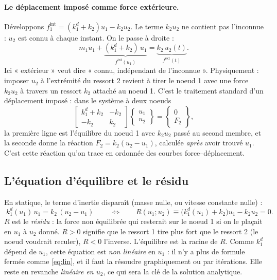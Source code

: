\documentclass[11pt,a4paper]{article}
\newcommand{\kd}{k_1^{d}}
\begin{document}
\paragraph{Le déplacement imposé comme force extérieure.} Développons
$f^{\text{int}}_1 = (\kd+k_2)u_1 - k_2u_2$. Le terme $k_2u_2$ ne contient pas l'inconnue : $u_2$
est connu à chaque instant. On le passe à droite :
\begin{equation}
  m_1\ddot u_1 + \underbrace{(\kd+k_2)\,u_1}_{f^{\text{int}}(u_1)} = \underbrace{k_2\,u_2(t)}_{f^{\text{ext}}(t)} .
\end{equation}
Ici « extérieur » veut dire « connu, indépendant de l'inconnue ». Physiquement : imposer $u_2$
à l'extrémité du ressort 2 revient à tirer le noeud 1 avec une force $k_2u_2$ à travers un
ressort $k_2$ attaché au noeud 1. C'est le traitement standard d'un déplacement imposé : dans
le système à deux noeuds
\begin{equation}
  \begin{bmatrix} \kd+k_2 & -k_2\\ -k_2 & k_2\end{bmatrix}
  \begin{Bmatrix}u_1\\u_2\end{Bmatrix} = \begin{Bmatrix}0\\F_2\end{Bmatrix},
\end{equation}
la première ligne est l'équilibre du noeud 1 avec $k_2u_2$ passé au second membre, et la seconde
donne la réaction $F_2 = k_2(u_2-u_1)$, calculée \emph{après} avoir trouvé $u_1$. C'est cette
réaction qu'on trace en ordonnée des courbes force--déplacement.

\subsection{L'équation d'équilibre et le résidu}
En statique, le terme d'inertie disparaît (masse nulle, ou vitesse constante nulle) :
\begin{equation}
  \boxed{\;\kd(u_1)\,u_1 = k_2\,(u_2-u_1)\;}
  \qquad\Longleftrightarrow\qquad
  R(u_1;u_2) \equiv \bigl(\kd(u_1)+k_2\bigr)u_1 - k_2u_2 = 0 .
  \label{eq:eq}
\end{equation}
$R$ est le \emph{résidu} : la force non équilibrée qui resterait sur le noeud 1 si on le
plaçait en $u_1$ à $u_2$ donné. $R > 0$ signifie que le ressort 1 tire plus fort que le
ressort 2 (le noeud voudrait reculer), $R < 0$ l'inverse. L'équilibre est la racine de $R$.
Comme $\kd$ dépend de $u_1$, cette équation est \emph{non linéaire} en $u_1$ : il n'y a plus de
formule fermée comme \eqref{eq:lin}, et il faut la résoudre graphiquement ou par itérations.
Elle reste en revanche \emph{linéaire en $u_2$}, ce qui sera la clé de la solution analytique.
\end{document}
